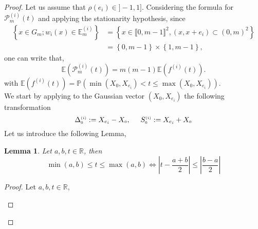 \documentclass[12pt]{article}
\theoremstyle{Theorem}
\newtheorem{Lemma}[Theorem]{Lemma}
\begin{document}
\begin{proof}
Let us assume that $\rho(e_{i}) \in ]-1,1]$. Considering the formula for $\mathcal{P}^{\scriptscriptstyle  (i)}_{m}(t)$ and applying the stationarity hypothesis, since
\begin{align*}
\left\{ x \in G_{m}; w_{i}(x) \in \mathbb{E}^{\scriptscriptstyle  (i)}_{m}\right\} & = \left\{x \in \llbracket 0, m-1 \rrbracket^{2}, (x, x+e_i)\subset (0,m)^{2} \right\} \\ 
& = \left\{ 0, m-1 \right\} \times \left\{ 1, m - 1\right\},
\end{align*}
one can write that, 
\begin{equation*}
\mathbb{E}\left(\mathcal{P}^{\scriptscriptstyle  (i)}_{m}(t) \right) = m(m-1)\mathbb{E}\left(f^{(i)}(t)\right).
\label{covarianeproof}
\end{equation*}
 with $\mathbb{E}\left(f^{(i)}(t)\right) = \mathbb{P}\left(\min\left(X_{\scriptscriptstyle 0}, X_{e_i}\right) < t \leq \max\left(X_{\scriptscriptstyle 0}, X_{e_i}\right)\right)$. \\
 We start by applying to the Gaussian vector $\left(X_{\scriptscriptstyle 0}, X_{e_i}\right)$ the following transformation \begin{equation*} \label{expressions} \Delta^{\scriptscriptstyle (i)}_{\scriptscriptstyle 0} := X_{e_i} - X_{\scriptscriptstyle 0}, \hspace{0.5cm} S^{\scriptscriptstyle (i)}_{\scriptscriptstyle 0} := X_{e_i} + X_{\scriptscriptstyle 0}\end{equation*}
Let us introduce the following Lemma, 
\begin{Lemma}
\label{lemmasommediff}
Let $a,b,t \in \mathbb{R}$, then 
$$\min(a,b) \leq t \leq \max(a,b) \iff\left|t - \frac{a+b}{2}\right| \leq \left| \frac{ b-a }{2}\right| $$
\end{Lemma}
\begin{proof}
Let $a,b,t \in \mathbb{R}$,
\begin{figure}[H]
\centering
{}
\end{figure}


\end{proof}
\end{proof}
\end{document}
